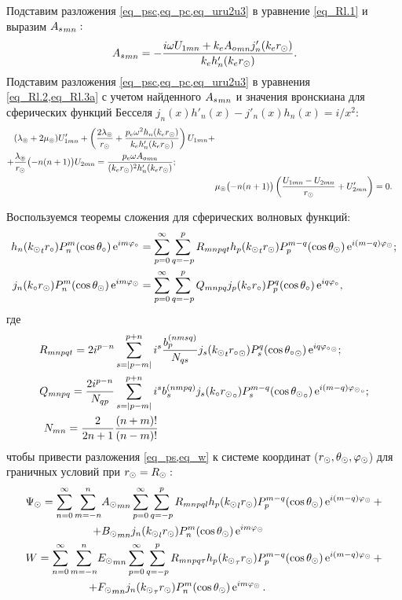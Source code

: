 Подставим разложения \cref{eq_psc,eq_pc,eq_uru2u3} в уравнение \cref{eq_Rl.1} и выразим ${A\sc}_{mn}:$
\begin{equation}\label{eq_Psc_U1}
{A\sc}_{mn} = -\fr{i\om U_{1mn}+k\en {A\o}_{mn}j'_n(k\en r\s)}{k\en h'_n(k\en r\s)}.
\end{equation}
Подставим разложения \cref{eq_psc,eq_pc,eq_uru2u3} в уравнения \cref{eq_Rl.2,eq_Rl.3a} с учетом найденного ${A\sc}_{mn}$ и значения вронскиана для сферических функций Бесселя $j_n(x)h'_n(x)-j'_n(x)h_n(x)=i/x^2:$
\begin{align}
\begin{split}
&(\la\l+2\mu\l)U'_{1mn} + \left(\fr{2\la\l}{r\s} + \fr{p\en\om^2 h_n(k\en r\s)}{k\en h'_n(k\en r\s)}\right)U_{1mn} + \\
+& \fr{\la\l}{r\s}\bigl(-n(n+1)\bigr)U_{2mn}
= \fr{p\en\om {A\o}_{mn}}{(k\en r\s)^2 h'_n(k\en r\s)};
\end{split}\\
&\mu\l\bigl(-n(n+1)\bigr)\left(\fr{U_{1mn}-U_{2mn}}{r\s} + U'_{2mn}\right) = 0.
\end{align}

Воспользуемся теоремы сложения для сферических волновых функций:
\begin{align*}
h_n({k\s}_t r\c)P_n^m(\cos\Q\c)\e^{im\f\c} &= \sum_{p=0}^{\infty}\sum_{q=-p}^{p}R_{mnpqt} h_p({k\s}_t r\s)P_p^{m-q}(\cos\Q\s)\e^{i(m-q)\f\s};\\
j_n(k\c r\s)P_n^m(\cos\Q\s)\e^{im\f\s} &= \sum_{p=0}^{\infty}\sum_{q=-p}^{p}Q_{mnpq} j_p(k\c r\c)P_p^{q}(\cos\Q\c)\e^{iq\f\c},\\
\end{align*}
где
\begin{align*}
R_{mnpqt} = 2i^{p-n}&\sum_{s=\lvert p-m\rvert}^{p+n} i^s \fr{b_p^{(nmsq)}}{N_{qs}} j_s({k\s}_t {r\c}\s)P_s^{q}(\cos{\Q\c}\s)\e^{iq{\f\c}\s};\\
Q_{mnpq} = \fr{2i^{p-n}}{N_{qp}}&\sum_{s=\lvert p-m\rvert}^{p+n} i^s b_s^{(nmpq)} j_s(k\c {r\s}\c)P_s^{m-q}(\cos{\Q\s}\c)\e^{i(m-q){\f\s}\c};\\
N_{mn}=\fr{2}{2n+1}&\fr{(n+m)!}{(n-m)!}
\end{align*}
чтобы привести разложения \cref{eq_ps,eq_w} к системе координат ($r\s,\Q\s, \f\s$) для граничных условий при $r\s=R\s:$
\begin{align}
\begin{split}
\P\s = \sum\limits_{n=0}^\infty \sum\limits_{m=-n}^n
  &{A\s}_{mn} \sum_{p=0}^{\infty}\sum_{q=-p}^{p}R_{mnpql} h_p({k\s}_l r\s)P_p^{m-q}(\cos\Q\s)\e^{i(m-q)\f\s} +\\
+ &{B\s}_{mn} j_n({k\s}_lr\s)P_n^m(\cos\Q\s)\e^{im\f\s}
\end{split}\label{eq_new_ps}\\
\begin{split}
W = \sum\limits_{n=0}^\infty \sum\limits_{m=-n}^n &{E\s}_{mn} \sum_{p=0}^{\infty}\sum_{q=-p}^{p}R_{mnpq\t} h_p({k\s}_\t r\s)P_p^{m-q}(\cos\Q\s)\e^{i(m-q)\f\s} + \\
+ &{F\s}_{mn} j_n({k\s}_\t r\s)P_n^m(\cos\Q\s)\e^{im\f\s}.
\end{split}\label{eq_new_w}
\end{align}

